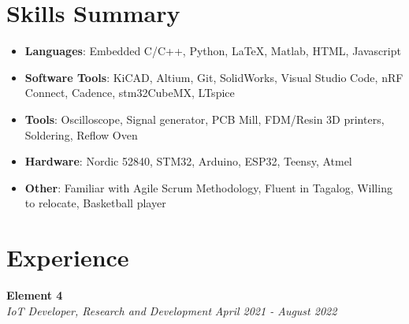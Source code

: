 \documentclass[a4paper,20pt]{article}
\newcommand{\resumeItem}[2]{
  \item\small{
    \textbf{#1}{: #2 \vspace{-2pt}}
  }
}
\newcommand{\resumeSubItem}[2]{\resumeItem{#1}{#2}\vspace{-3pt}}
\newcommand{\resumeSubHeadingListStart}{\begin{itemize}[leftmargin=*]}
\newcommand{\resumeSubHeadingListEnd}{\end{itemize}}
\begin{document}
\section{Skills Summary}
	\resumeSubHeadingListStart
	\resumeSubItem{Languages}{\hspace{3em}Embedded C/C++, Python, LaTeX, Matlab, HTML, Javascript}
	\resumeSubItem{Software Tools}{\hspace{0.8em}KiCAD, Altium, Git, SolidWorks, Visual Studio Code, nRF Connect, Cadence, stm32CubeMX, LTspice}
	\resumeSubItem{Tools}{\hspace{5.5em}Oscilloscope, Signal generator, PCB Mill, FDM/Resin 3D printers, Soldering, Reflow Oven}
    \resumeSubItem{Hardware}{\hspace{3.3em}Nordic 52840, STM32, Arduino, ESP32, Teensy, Atmel}
    \resumeSubItem{Other}{\hspace{5.3em}Familiar with Agile Scrum Methodology, Fluent in Tagalog, Willing to relocate, Basketball player}
    \resumeSubHeadingListEnd
\vspace{-3pt}

\section{Experience}
    \vspace{-1pt}
        \textbf{Element 4}\hspace{13.5 cm}
        \textit{}\\
        \textit{IoT Developer, Research and Development} \hspace{7.8 cm}
        \textit{April 2021 - August 2022} \\
        \vspace{-18pt} 
        \hspace{-1pt}
\end{document}
